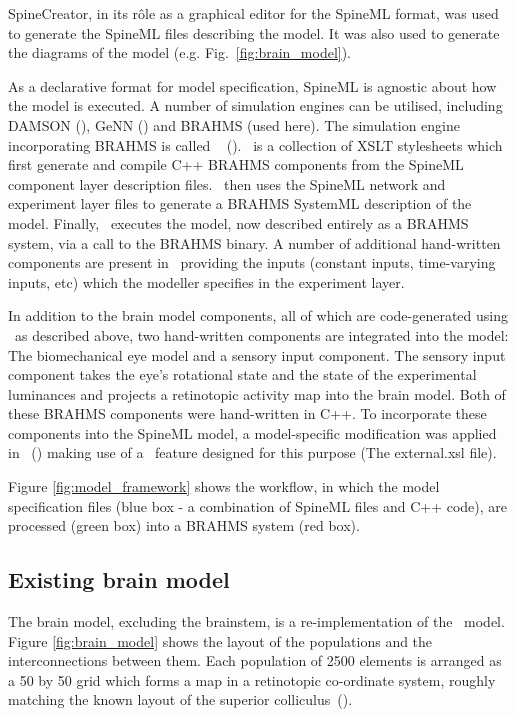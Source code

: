 \documentclass{frontiersSCNS}
\begin{document}
SpineCreator, in its r\^ole as a graphical editor for the SpineML
format, was used to generate the SpineML files describing the
model. It was also used to generate the diagrams of the model
(e.g. Fig.~\ref{fig:brain_model}).

As a declarative format for model specification, SpineML is agnostic
about how the model is executed. A number of simulation
engines can be utilised, including DAMSON (), GeNN
() and BRAHMS (used
here). The simulation engine incorporating BRAHMS is called \stob~
(). \stob~is a collection of XSLT
stylesheets which first generate and compile C++ BRAHMS components
from the SpineML component layer description files. \stob~then uses
the SpineML network and experiment layer files to generate a BRAHMS
SystemML description of the model. Finally, \stob~executes the model,
now described entirely as a BRAHMS system, via a call to the BRAHMS
binary. A number of additional hand-written components are present
in \stob~providing the inputs (constant inputs, time-varying inputs,
etc) which the modeller specifies in the experiment layer.

In addition to the brain model components, all of which are
code-generated using \stob~as described above, two hand-written
components are integrated into the model: The biomechanical eye model
and a sensory input component. The sensory input component takes the
eye's rotational state and the state of the experimental luminances
and projects a retinotopic activity map into the brain model. Both of
these BRAHMS components were hand-written in C++. To incorporate these
components into the SpineML model, a model-specific modification was
applied in \stob~() making use of
a \stob~feature designed for this purpose (The external.xsl file).

Figure \ref{fig:model_framework} shows the workflow, in which the
model specification files (blue box - a combination of SpineML files
and C++ code), are processed (green box) into a BRAHMS system (red
box).

\subsection{Existing brain model}

The brain model, excluding the brainstem, is a re-implementation of
the \ccg~model. Figure \ref{fig:brain_model} shows the layout of the
populations and the interconnections between them. Each population of
2500 elements is arranged as a 50 by 50 grid which forms a map in a
retinotopic co-ordinate system, roughly matching the known layout of
the superior colliculus~(). %
\end{document}
